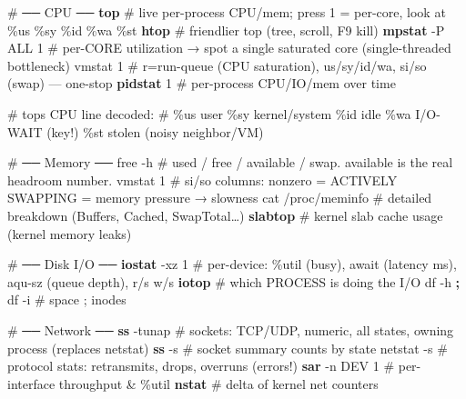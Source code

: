 \documentclass[11pt]{article}
\newenvironment{Shaded}{\begin{snugshade}}{\end{snugshade}}
\newcommand{\AttributeTok}[1]{\textcolor[rgb]{0.16,0.50,0.73}{#1}}
\newcommand{\CommentTok}[1]{\textcolor[rgb]{0.48,0.49,0.49}{#1}}
\newcommand{\ExtensionTok}[1]{\textcolor[rgb]{0.00,0.60,1.00}{\textbf{#1}}}
\newcommand{\FunctionTok}[1]{\textcolor[rgb]{0.56,0.27,0.68}{#1}}
\newcommand{\KeywordTok}[1]{\textcolor[rgb]{0.81,0.81,0.76}{\textbf{#1}}}
\newcommand{\NormalTok}[1]{\textcolor[rgb]{0.81,0.81,0.76}{#1}}
\begin{document}

\begin{Shaded}
\begin{Highlighting}[]
\CommentTok{\# ── CPU ──}
\ExtensionTok{top}                  \CommentTok{\# live per{-}process CPU/mem; press 1 = per{-}core, look at \%us \%sy \%id \%wa \%st}
\ExtensionTok{htop}                 \CommentTok{\# friendlier top (tree, scroll, F9 kill)}
\ExtensionTok{mpstat} \AttributeTok{{-}P}\NormalTok{ ALL 1      }\CommentTok{\# per{-}CORE utilization → spot a single saturated core (single{-}threaded bottleneck)}
\FunctionTok{vmstat}\NormalTok{ 1             }\CommentTok{\# \textquotesingle{}r\textquotesingle{}=run{-}queue (CPU saturation), \textquotesingle{}us/sy/id/wa\textquotesingle{}, \textquotesingle{}si/so\textquotesingle{} (swap) — one{-}stop}
\ExtensionTok{pidstat}\NormalTok{ 1            }\CommentTok{\# per{-}process CPU/IO/mem over time}

\CommentTok{\# top\textquotesingle{}s CPU line decoded:}
\CommentTok{\#   \%us user   \%sy kernel/system   \%id idle   \%wa I/O{-}WAIT (key!)   \%st stolen (noisy neighbor/VM)}

\CommentTok{\# ── Memory ──}
\FunctionTok{free} \AttributeTok{{-}h}              \CommentTok{\# used / free / available / swap. \textquotesingle{}available\textquotesingle{} is the real headroom number.}
\FunctionTok{vmstat}\NormalTok{ 1             }\CommentTok{\# si/so columns: nonzero = ACTIVELY SWAPPING = memory pressure → slowness}
\FunctionTok{cat}\NormalTok{ /proc/meminfo    }\CommentTok{\# detailed breakdown (Buffers, Cached, SwapTotal…)}
\ExtensionTok{slabtop}              \CommentTok{\# kernel slab cache usage (kernel memory leaks)}

\CommentTok{\# ── Disk I/O ──}
\ExtensionTok{iostat} \AttributeTok{{-}xz}\NormalTok{ 1         }\CommentTok{\# per{-}device: \%util (busy), await (latency ms), aqu{-}sz (queue depth), r/s w/s}
\ExtensionTok{iotop}                \CommentTok{\# which PROCESS is doing the I/O}
\FunctionTok{df} \AttributeTok{{-}h} \KeywordTok{;} \FunctionTok{df} \AttributeTok{{-}i}        \CommentTok{\# space ; inodes}

\CommentTok{\# ── Network ──}
\ExtensionTok{ss} \AttributeTok{{-}tunap}            \CommentTok{\# sockets: TCP/UDP, numeric, all states, owning process (replaces netstat)}
\ExtensionTok{ss} \AttributeTok{{-}s}                \CommentTok{\# socket summary counts by state}
\FunctionTok{netstat} \AttributeTok{{-}s}           \CommentTok{\# protocol stats: retransmits, drops, overruns (errors!)}
\ExtensionTok{sar} \AttributeTok{{-}n}\NormalTok{ DEV 1         }\CommentTok{\# per{-}interface throughput \& \%util}
\ExtensionTok{nstat}                \CommentTok{\# delta of kernel net counters}


\end{Highlighting}
\end{Shaded}
\end{document}
